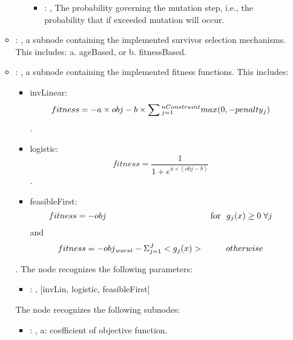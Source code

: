 \begin{itemize}
\begin{itemize}
\begin{itemize}
\begin{itemize}
                \item {}: , 
                  The probability governing the mutation step, i.e., the probability that if
                  exceeded mutation will occur.
              \end{itemize}
          \end{itemize}

        \item {}: , 
          a subnode containing the implemented survivor selection mechanisms.                   This
          includes: a.    ageBased, or                                  b.    fitnessBased.

        \item {}: , 
          a subnode containing the implemented fitness functions.                   This includes:
          \begin{itemize}                                 \item    invLinear:
          \[fitness = -a \times obj - b \times \sum\\_{j=1}^{nConstraint} max(0,-penalty\\_j) \].
          \item    logistic:                                  \[fitness =
          \frac{1}{1+e^{a\times(obj-b)}}\].
          \item           feasibleFirst:                                  \[fitness =           -obj
          \ \ \  \ \ \ \ \ \ \ \ \ \ \ \ \ \ \ \ \ \ \ \ \ \ \ \ \ \ \ \ \ \ \ \ \ \ \text{for}   \
          \ g\\_j(x)\geq 0 \;  \forall j\]                                  and           \[fitness
          = -obj\\_{worst} - \Sigma\\_{j=1}^{J}<g\\_j(x)>   \ \ \ \ \ \ \ \   otherwise \]
          \end{itemize}.
          The  node recognizes the following parameters:
            \begin{itemize}
              \item {}: , 
                [invLin, logistic, feasibleFirst]
          \end{itemize}

          The  node recognizes the following subnodes:
          \begin{itemize}
            \item {}: , 
              a: coefficient of objective function.


\end{itemize}
\end{itemize}
\end{itemize}
